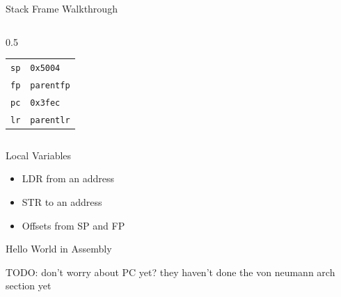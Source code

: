 \begin{frame}{Stack Frame Walkthrough}
\begin{columns}
\begin{column}{0.5\textwidth}
			\vspace{1cm}

			\begin{alltt}
				\begin{tabular}{ r | l}
					sp & 0x5004    \\
					fp & parent fp \\
					pc & 0x3fec    \\
					lr & parent lr \\
				\end{tabular}
			\end{alltt}
		\end{column}
	\end{columns}

\end{frame}



\begin{frame}{Local Variables}
	\begin{itemize}
		\item LDR from an address
		\item STR to an address
		\item Offsets from SP and FP
	\end{itemize}
\end{frame}








\begin{frame}{Hello World in Assembly}

	{\Huge
		TODO: don't worry about PC yet? they haven't done the von neumann arch section yet}

\end{frame}


